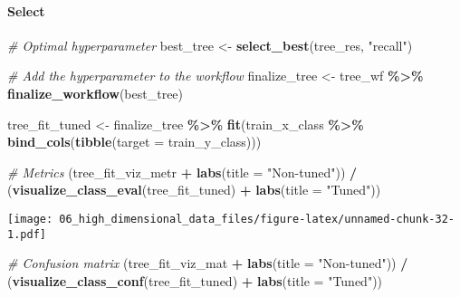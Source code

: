\documentclass[
]{book}
\newenvironment{Shaded}{\begin{snugshade}}{\end{snugshade}}
\newcommand{\CommentTok}[1]{\textcolor[rgb]{0.56,0.35,0.01}{\textit{#1}}}
\newcommand{\DataTypeTok}[1]{\textcolor[rgb]{0.13,0.29,0.53}{#1}}
\newcommand{\KeywordTok}[1]{\textcolor[rgb]{0.13,0.29,0.53}{\textbf{#1}}}
\newcommand{\NormalTok}[1]{#1}
\newcommand{\OperatorTok}[1]{\textcolor[rgb]{0.81,0.36,0.00}{\textbf{#1}}}
\newcommand{\StringTok}[1]{\textcolor[rgb]{0.31,0.60,0.02}{#1}}
\begin{document}
\hypertarget{select-1}{%
\paragraph{Select}\label{select-1}}

\begin{Shaded}
\begin{Highlighting}[]
\CommentTok{\# Optimal hyperparameter}
\NormalTok{best\_tree \textless{}{-}}\StringTok{ }\KeywordTok{select\_best}\NormalTok{(tree\_res, }\StringTok{"recall"}\NormalTok{)}

\CommentTok{\# Add the hyperparameter to the workflow }
\NormalTok{finalize\_tree \textless{}{-}}\StringTok{ }\NormalTok{tree\_wf }\OperatorTok{\%\textgreater{}\%}
\StringTok{  }\KeywordTok{finalize\_workflow}\NormalTok{(best\_tree)}
\end{Highlighting}
\end{Shaded}

\begin{Shaded}
\begin{Highlighting}[]
\NormalTok{tree\_fit\_tuned \textless{}{-}}\StringTok{ }\NormalTok{finalize\_tree }\OperatorTok{\%\textgreater{}\%}\StringTok{ }
\StringTok{  }\KeywordTok{fit}\NormalTok{(train\_x\_class }\OperatorTok{\%\textgreater{}\%}\StringTok{ }\KeywordTok{bind\_cols}\NormalTok{(}\KeywordTok{tibble}\NormalTok{(}\DataTypeTok{target =}\NormalTok{ train\_y\_class)))}

\CommentTok{\# Metrics }
\NormalTok{(tree\_fit\_viz\_metr }\OperatorTok{+}\StringTok{ }\KeywordTok{labs}\NormalTok{(}\DataTypeTok{title =} \StringTok{"Non{-}tuned"}\NormalTok{)) }\OperatorTok{/}\StringTok{ }\NormalTok{(}\KeywordTok{visualize\_class\_eval}\NormalTok{(tree\_fit\_tuned) }\OperatorTok{+}\StringTok{ }\KeywordTok{labs}\NormalTok{(}\DataTypeTok{title =} \StringTok{"Tuned"}\NormalTok{))}
\end{Highlighting}
\end{Shaded}

\texttt{[image: 06\_high\_dimensional\_data\_files/figure-latex/unnamed-chunk-32-1.pdf]}

\begin{Shaded}
\begin{Highlighting}[]
\CommentTok{\# Confusion matrix }
\NormalTok{(tree\_fit\_viz\_mat }\OperatorTok{+}\StringTok{ }\KeywordTok{labs}\NormalTok{(}\DataTypeTok{title =} \StringTok{"Non{-}tuned"}\NormalTok{)) }\OperatorTok{/}\StringTok{ }\NormalTok{(}\KeywordTok{visualize\_class\_conf}\NormalTok{(tree\_fit\_tuned) }\OperatorTok{+}\StringTok{ }\KeywordTok{labs}\NormalTok{(}\DataTypeTok{title =} \StringTok{"Tuned"}\NormalTok{))}
\end{Highlighting}
\end{Shaded}
\end{document}
